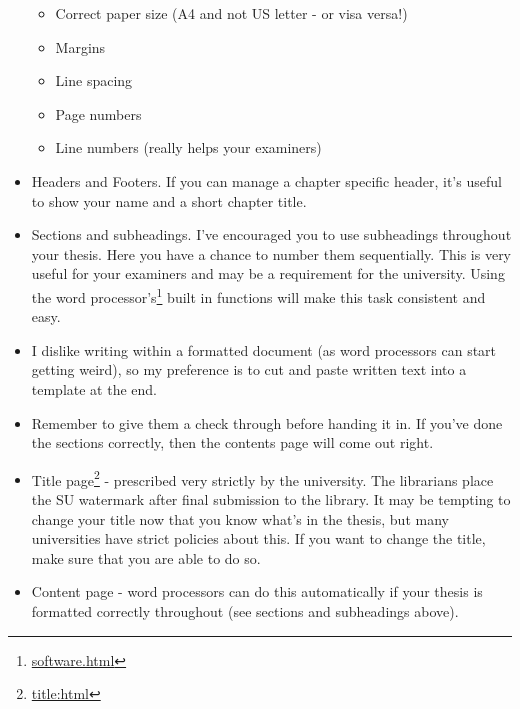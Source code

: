 \documentclass[
]{krantz}
\providecommand{\tightlist}{%
  \setlength{\itemsep}{0pt}\setlength{\parskip}{0pt}}
\renewcommand{\href}[2]{#2\footnote{\url{#1}}}
\begin{document}
\begin{itemize}
  \begin{itemize}
  \tightlist
  \item
    Correct paper size (A4 and not US letter - or visa versa!)
  \item
    Margins
  \item
    Line spacing
  \item
    Page numbers
  \item
    Line numbers (really helps your examiners)
  \end{itemize}
\item
  Headers and Footers. If you can manage a chapter specific header, it's useful to show your name and a short chapter title.
\item
  Sections and subheadings. I've encouraged you to use subheadings throughout your thesis. Here you have a chance to number them sequentially. This is very useful for your examiners and may be a requirement for the university. Using the \href{software.html}{word processor's} built in functions will make this task consistent and easy.
\item
  I dislike writing within a formatted document (as word processors can start getting weird), so my preference is to cut and paste written text into a template at the end.
\item
  Remember to give them a check through before handing it in. If you've done the sections correctly, then the contents page will come out right.
\item
  \href{title:html}{Title page} - prescribed very strictly by the university. The librarians place the SU watermark after final submission to the library. It may be tempting to change your title now that you know what's in the thesis, but many universities have strict policies about this. If you want to change the title, make sure that you are able to do so.
\item
  Content page - word processors can do this automatically if your thesis is formatted correctly throughout (see sections and subheadings above).


\end{itemize}
\end{document}
